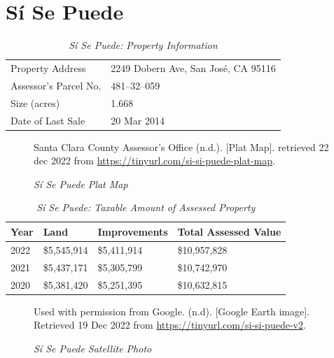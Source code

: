 
\clearpage
\section{Sí Se Puede}\label{sec:sí-se-puede-info}\indent

\begin{table}[htbp]
  \SingleSpacing%
  \caption[Sí Se Puede: Property Information]{\textit{Sí Se Puede: Property Information}}\label{tab:sí-se-puede-prop-info}
  \begin{tabular}{ll}
    \toprule
    Property Address      & 2249 Dobern Ave, San José, CA 95116 \\
    Assessor's Parcel No. &  481–32–059 \\
    Size (acres)          &  1.668\\
    Date of Last Sale     &  20 Mar 2014 \\
    \bottomrule
  \end{tabular}
\end{table}

\begin{figure}[hbtp]
  \caption[Sí Se Puede Plat Map]{\textit{Sí Se Puede Plat Map}}%
  \label{fig:sí-se-puede-plat-map}
  {Santa Clara County Assessor's Office (n.d.). [Plat Map]. retrieved 22 dec 2022 from \url{https://tinyurl.com/si-si-puede-plat-map}.}
\end{figure}

\begin{table}[htbp]
  \SingleSpacing%
  \caption[Sí Se Puede: Taxable Amount of Assessed Property]{\textit{Sí Se Puede: Taxable Amount of Assessed Property}}%
  \label{tab:sí-se-puede-taxable-amount}
  \begin{tabular}{llll}
    \toprule
    Year & Land        & Improvements & Total Assessed Value \\
    \midrule
    2022 & \$5,545,914 & \$5,411,914  & \$10,957,828 \\
    2021 & \$5,437,171 & \$5,305,799  & \$10,742,970 \\
    2020 & \$5,381,420 & \$5,251,395  & \$10,632,815 \\
    \bottomrule
  \end{tabular}
\end{table}

\begin{figure}[hbtp]
  \caption[Sí Se Puede Satellite Photo]{\textit{Sí Se Puede Satellite Photo}}%
  \label{fig:sí-se-puede-sat-photo}
  {Used with permission from Google. (n.d). [Google Earth image]. Retrieved 19 Dec 2022 from \url{https://tinyurl.com/si-si-puede-v2}.}
\end{figure}

